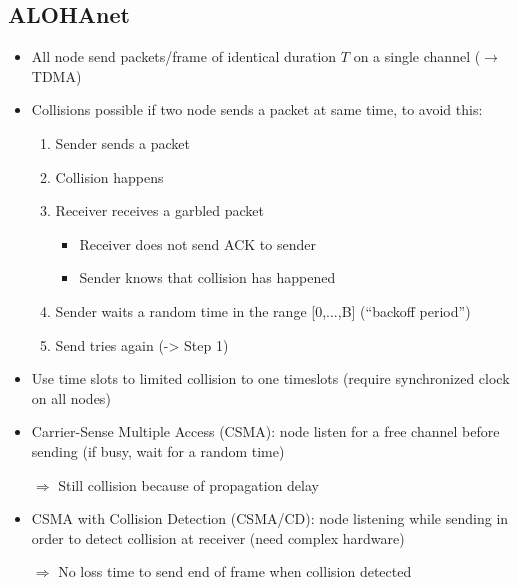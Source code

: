 \subsection{ALOHAnet}
\begin{itemize}
    \item All node send packets/frame of identical duration $T$ on a single
        channel ($\rightarrow$ TDMA)

    \item Collisions possible if two node sends a packet at same time,
        to avoid this:
        \begin{enumerate}
            \item Sender sends a packet
            \item Collision happens
            \item Receiver receives a garbled packet
                \begin{itemize}
                    \item Receiver does not send ACK to sender
                    \item Sender knows that collision has happened
                \end{itemize}
            \item Sender waits a random time in the range [0,...,B] (“backoff period”)
            \item Send tries again (-> Step 1)
        \end{enumerate}

    \item Use time slots to limited collision to one timeslots (require
        synchronized clock on all nodes)

    \item Carrier-Sense Multiple Access (CSMA): node listen for a free
        channel before sending (if busy, wait for a random time)

        $\Rightarrow$ Still collision because of propagation delay

    \item CSMA with Collision Detection (CSMA/CD): node listening while
        sending in order to detect collision at receiver (need complex
        hardware)

        $\Rightarrow$ No loss time to send end of frame when collision
        detected


\end{itemize}
